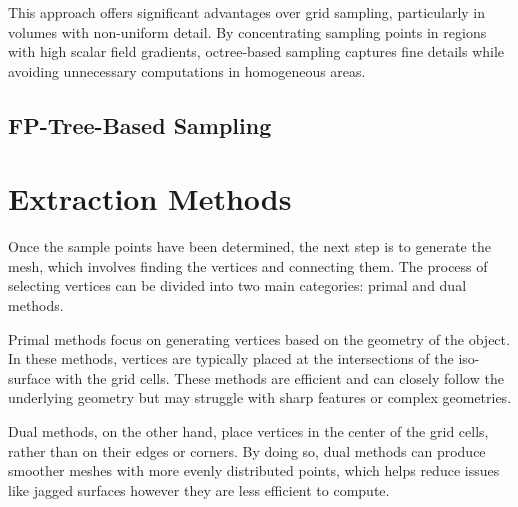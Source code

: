 This approach offers significant advantages over grid sampling, particularly in volumes with non-uniform detail. By concentrating sampling points in regions with high scalar field gradients, octree-based sampling captures fine details while avoiding unnecessary computations in homogeneous areas.

\subsection{FP-Tree-Based Sampling}



\section{Extraction Methods}

Once the sample points have been determined, the next step is to generate the mesh, which involves finding the vertices and connecting them. The process of selecting vertices can be divided into two main categories: primal and dual methods.

Primal methods focus on generating vertices based on the geometry of the object. In these methods, vertices are typically placed at the intersections of the iso-surface with the grid cells. These methods are efficient and can closely follow the underlying geometry but may struggle with sharp features or complex geometries.

Dual methods, on the other hand, place vertices in the center of the grid cells, rather than on their edges or corners. By doing so, dual methods can produce smoother meshes with more evenly distributed points, which helps reduce issues like jagged surfaces however they are less efficient to compute.

